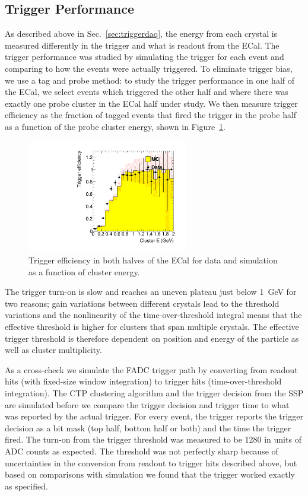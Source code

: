 \documentclass[final,3p,times,twocolumn]{elsarticle}
\begin{document}
\subsection{Trigger Performance}
As described above in Sec.~\ref{sec:triggerdaq}, the energy from each 
crystal is measured differently in the trigger and what is readout from the ECal. 
The trigger performance was studied by simulating the 
trigger for each event and comparing to how the events were actually triggered.
To eliminate trigger bias, we use a tag and probe method: to study the trigger performance in one half 
of the ECal, we select 
events which triggered the other half and where there was exactly one probe cluster in the ECal half 
under study. We then measure trigger efficiency as the fraction of tagged events that fired the trigger in 
the probe half as a function of the probe cluster energy, shown in Figure~\ref{fig:turnon}. 
\begin{figure}[ht]
\begin{center}
{\small
	\includegraphics[width=7cm]{figures/h_cl_E_probedata_eff_h_cl_E_probeMC_eff_dataMC_1351-v7-trig-tagBot.pdf}
	\caption{Trigger efficiency in both halves of the ECal for data and simulation as a 
	function of cluster energy.}
\label{fig:turnon}
}
\end{center}
\end{figure}
The trigger turn-on is slow and reaches an uneven plateau just below 1~GeV for two reasons;  
gain variations between different crystals lead to the threshold variations and the nonlinearity of 
the time-over-threshold integral means that the effective threshold is higher for clusters that span 
multiple crystals. The effective trigger threshold is therefore dependent on position and energy of 
the particle as well as cluster multiplicity. 

As a cross-check we simulate the FADC trigger path by converting from readout hits (with fixed-size 
window integration) to trigger hits (time-over-threshold integration). The CTP clustering 
algorithm and the trigger decision from the SSP are simulated before we compare the trigger decision 
and trigger time to what was reported by the actual trigger. For every event, the trigger reports the 
trigger decision as a bit mask (top half, bottom half or both) and the time the trigger fired.
The turn-on from the trigger threshold was measured to be 1280 in units of ADC counts as expected. 
The threshold was not perfectly sharp because of uncertainties in the conversion from readout to trigger 
hits described above, but based on comparisons with simulation we found that the 
trigger worked exactly as specified.
\end{document}
